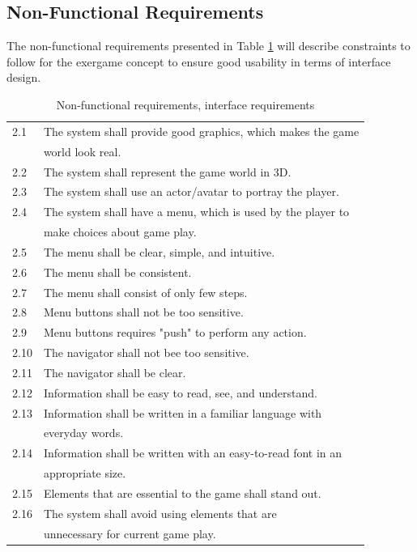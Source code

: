 \subsection{Non-Functional Requirements}
The non-functional requirements presented in Table \ref{tab:nfunc} will describe constraints to follow for the exergame concept to ensure good usability in terms of interface design.

\begin{table} [H]
\label{tab:nfunc}
\centering
\begin{tabular}{|l|l|} 
\hline
2.1 & The system shall provide good graphics, which makes the game \\ & world look real. \\ \hline
2.2 & The system shall represent the game world in 3D.\\ \hline
2.3 & The system shall use an actor/avatar to portray the player.\\ \hline
2.4 & The system shall have a menu, which is used by the player to \\ & make choices about game play.\\ \hline
2.5 & The menu shall be clear, simple, and intuitive.\\ \hline
2.6 & The menu shall be consistent. \\ \hline
2.7 & The menu shall consist of only few steps.\\ \hline
2.8 & Menu buttons shall not be too sensitive.\\ \hline
2.9 & Menu buttons requires "push" to perform any action.\\ \hline
2.10 & The navigator shall not bee too sensitive. \\ \hline
2.11 & The navigator shall be clear.\\ \hline
2.12 & Information shall be easy to read, see, and understand.\\ \hline
2.13 & Information shall be written in a familiar language with \\ & everyday words.  \\ \hline
2.14 & Information shall be written with an easy-to-read font in an \\ & appropriate size. \\ \hline
2.15 & Elements that are essential to the game shall stand out.\\ \hline
2.16 & The system shall avoid using elements that are \\ & unnecessary for current game play.\\ \hline
\end{tabular}
\caption[Non-functional requirements]{Non-functional requirements, interface requirements}
\end{table} 

